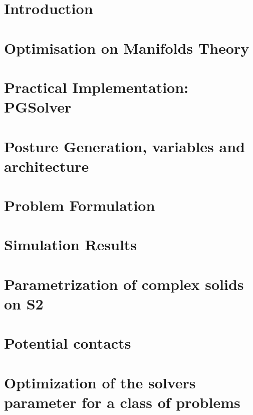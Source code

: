 \section{Introduction}
\label{sec:Introduction}

\section{Optimisation on Manifolds Theory}
\label{sec:Optimisation on Manifolds Theory}

\section{Practical Implementation: PGSolver}
\label{sec:Practical Implementation}

\section{Posture Generation, variables and architecture}
\label{sec:posture_generation_variables_and_architecture}

\section{Problem Formulation}
\label{sec:problem_formulation}

\section{Simulation Results}
\label{sec:simulation_results}

\section{Parametrization of complex solids on S2}
\label{sec:parametrization_of_complex_solids_on_s2}

\section{Potential contacts}
\label{sec:potential_contacts}

\section{Optimization of the solvers parameter for a class of problems}
\label{sec:optimization_of_the_solvers_parameter_for_a_class_of_problems}


